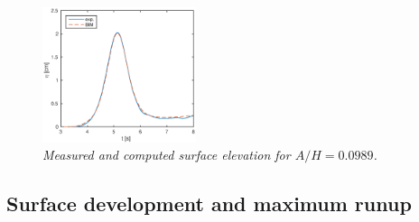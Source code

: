 \documentclass[review]{elsarticle}
\begin{document}
\begin{figure}
\centering
\includegraphics[width=0.4\textwidth]{./Figures/BIM/BIM_probes.eps}
\caption{\textit{Measured and computed surface elevation for $A/H=0.0989$.}}
\label{fig:surf_ele1}
\end{figure}


\subsection{Surface development and maximum runup}
\label{max_run}
\end{document}
